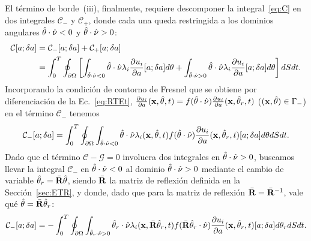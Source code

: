 El término de borde~(iii), finalmente, requiere 
descomponer la integral~\eqref{eq:C} en dos integrales
$\mathcal{C}_-$ y $\mathcal{C}_+$, 
donde cada una queda restringida a los dominios 
angulares  $\hat{\theta}\cdot \hat{\nu}<0$ y $\hat{\theta}\cdot \hat{\nu} >0$:
\begin{equation}
\begin{split}
\begin{aligned}
  \displaystyle \mathcal{C}[a;\delta a]&=\mathcal{C}_-[a;\delta a] + \mathcal{C}_+[a;\delta a]
  \\&=\int_0^T
  \oint_{\partial \Omega} \left[ \int_{\hat{\theta} \cdot \hat{\nu}<0} \hat{\theta}\cdot \hat{\nu} \lambda_i
  \frac{\partial u_i}{\partial a}[a;\delta a] d\theta + \int_{\hat{\theta} \cdot \hat{\nu}>0} \hat{\theta}\cdot \hat{\nu} \lambda_i
  \frac{\partial u_i}{\partial a}[a;\delta a] d\theta  \right] dS dt.
\end{aligned}
\end{split}
\label{eq:C2}
\end{equation}
Incorporando la condición de contorno de Fresnel que se obtiene 
por diferenciación de la Ec.~\eqref{eq:RTEt}, 
$\frac{\partial u_i}{\partial a}(\mathbf{x},\hat{\theta},t)=f(\hat{\theta} \cdot \hat{\nu})
\frac{\partial u_i}{\partial a}(\mathbf{x},\hat{\theta}_r,t)$ ($(\mathbf{x},\hat{\theta}) \in \Gamma_-$)  en el término $\mathcal{C}_-$ 
tenemos 
\begin{equation}
\begin{split}
\begin{aligned}
  \displaystyle\mathcal{C}_-[a;\delta a]=\int_0^T
  \oint_{\partial \Omega} \int_{\hat{\theta} \cdot \hat{\nu}<0} \hat{\theta}\cdot \hat{\nu} \lambda_i(\mathbf{x},\hat{\theta},t)
  f(\hat{\theta} \cdot \hat{\nu}) \frac{\partial u_i}{\partial a}(\mathbf{x},\hat{\theta}_r,t)[a;\delta a] d\theta  dS dt.
\end{aligned}
\end{split}
\label{eq:C2m}
\end{equation}
Dado que el término $\mathcal{C}-\mathcal{G}=0$ involucra dos integrales 
en $\hat{\theta}\cdot \hat{\nu} >0$, buscamos llevar la integral $\mathcal{C}_-$ en $\hat{\theta}\cdot \hat{\nu} <0$
al dominio $\hat{\theta}\cdot \hat{\nu}>0$ mediante el cambio de variable $\hat{\theta}_r=\bar{\mathbf{R}} \hat{\theta}$, 
siendo $\bar{\mathbf{R}}$ la matriz de reflexión definida en la Sección~\ref{sec:ETR}, y 
donde, dado que para la matriz de reflexión $\bar{\mathbf{R}}=\bar{\mathbf{R}}^{-1}$, vale qué $\hat{\theta}=\bar{\mathbf{R}}\hat{\theta}_r$:
\begin{equation}
\begin{split}
\begin{aligned}
  \displaystyle\mathcal{C}_-[a;\delta a]=-\int_0^T
  \oint_{\partial \Omega} \int_{\hat{\theta}_r \cdot \hat{\nu}>0} \hat{\theta}_r \cdot \hat{\nu} \lambda_i(\mathbf{x},\bar{\mathbf{R}} \hat{\theta}_r,t)
  f(\bar{\mathbf{R}} \hat{\theta}_r \cdot \hat{\nu}) \frac{\partial u_i}{\partial a}(\mathbf{x},\hat{\theta}_r,t)[a;\delta a] d\theta_r  dS dt.
\end{aligned}
\end{split}
\label{eq:C2m2}
\end{equation}
